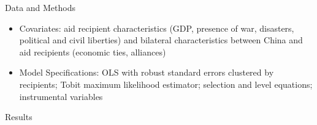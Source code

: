 \documentclass{beamer}
\begin{document}
\begin{frame}{Data and Methods}

\begin{itemize} 

\item Covariates: aid recipient characteristics (GDP, presence of war, disasters, political and civil liberties) and bilateral characteristics between China and aid recipients (economic ties, alliances)

\item Model Specifications: OLS with robust standard errors clustered by recipients; Tobit maximum likelihood estimator; selection and level equations; instrumental variables

\end{itemize}

\end{frame}


\begin{frame}{Results}



\end{frame}
\end{document}
